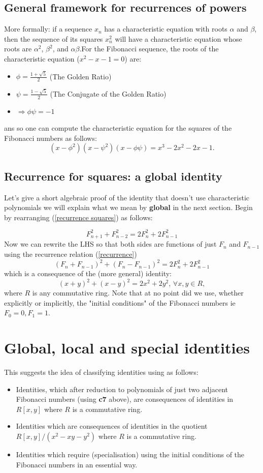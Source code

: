 \documentclass[12pt,a4paper]{amsart}
\begin{document}
\subsection{General framework for recurrences of powers}
More formally: if a sequence $x_n$ has a characteristic equation with roots $\alpha$ and $\beta$, then the sequence of its squares $x_n^2$ will have a characteristic equation whose roots are $\alpha^2$, $\beta^2$, and $\alpha\beta$.For the Fibonacci sequence, the roots of the characteristic equation ($x^2 - x - 1 = 0$) are:
\begin{itemize}
\item $\phi = \frac{1+\sqrt{5}}{2}$ (The Golden Ratio)
\item $\psi = \frac{1-\sqrt{5}}{2}$ (The Conjugate of the Golden Ratio)
\item $\Rightarrow \phi\psi = -1$ 
\end{itemize}
ans so one can compute the characteristic equation for the squares
of the Fibonacci numbers as follows:
$$(x - \phi^2)(x - \psi^2)(x - \phi\psi) = 
x^3 - 2x^2 - 2x - 1.$$

\subsection{Recurrence for squares:  a global identity}
 Let's give a short algebraic proof of the identity 
 that doesn't use characteristic polynomials
 we will explain what we mean by \textbf{global} in the next
 section. 
 Begin by rearranging (\ref{recurrence squares}) as follows:

$$ F_{n+1}^2 +  F_{n-2}^2 =  2F_n^2 + 2F_{n-1}^2$$
Now we can rewrite the LHS so that both sides are functions of just $F_{n}$ and $F_{n-1}$ using the recurrence relation (\ref{recurrence}) 
$$ (F_n + F_{n-1})^2 + (F_{n} - F_{n-1})^2 = 2F_n^2 + 2F_{n-1}^2$$
which is a consequence of the (more general) identity:
$$(x+y)^2 + (x-y)^2 = 2x^2 + 2y^2,\,\forall x,y\in R,$$
where $R$ is any commutative ring. Note that at no point did we use,
whether explicitly or implicitly, the "initial conditions" of the
Fibonacci numbers ie $F_0=0, F_1=1$.

\section{Global, local and special identities}
This suggests the idea of classifying identities using as follows:
\begin{itemize}
	\item[\textbf{global}] Identities, which after reduction to
		polynomials of just two adjacent Fibonacci
		numbers (using \textbf{c7} above), are consequences of identities in $R[x,y]$ where $R$ is a commutative ring. 
	\item[\textbf{local}] Identities which are consequences of
		identities in the quotient $R[x,y]/(x^2 - x y - y^2)$ where $R$ is a commutative ring.
	\item[\textbf{special}] Identities which require (specialisation) using the initial conditions of the Fibonacci numbers in an essential way.
\end{itemize}
\end{document}
